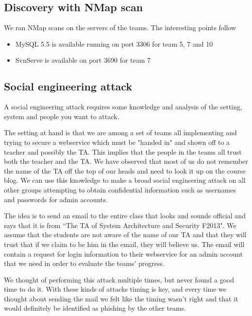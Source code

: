 \documentclass[a4paper]{article}
\begin{document}
\subsection{Discovery with NMap scan}
We ran NMap scans on the servers of the teams. The interesting points follow
\begin{itemize}
\item MySQL 5.5 is available running on port 3306 for team 5, 7 and 10
\item SvnServe is available on port 3690 for team 7
\end{itemize}


\subsection{Social engineering attack}
A social engineering attack requires some knowledge and analysis of the setting, system and people you want to attack.

The setting at hand is that we are among a set of teams all implementing and trying to secure a webservice which must be "handed in" and shown off to a teacher and possibly the TA. This implies that the people in the teams all trust both the teacher and the TA. We have observed that most of us do not remember the name of the TA off the top of our heads and need to look it up on the course blog.
We can use this knowledge to make a broad social engineering attack on all other groups attempting to obtain confidential information such as usernames and passwords for admin accounts.

The idea is to send an email to the entire class that looks and sounds official and says that it is from ``The TA of System Architecture and Security F2013". We assume that the students are not aware of the name of our TA and that they will trust that if we claim to be him in the email, they will believe us. The email will contain a request for login information to their webservice for an admin account that we need in order to evaluate the teams' progress.

We thought of performing this attack multiple times, but never found a good time to do it. With these kinds of attacks timing is key, and every time we thought about sending the mail we felt like the timing wasn't right and that it would definitely be identified as phishing by the other teams.


\end{document}
